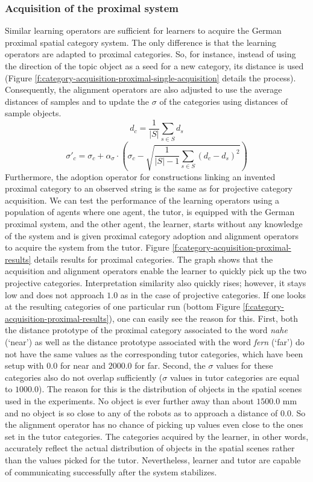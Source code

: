 \subsubsection{Acquisition of the proximal system}
Similar learning operators are sufficient for learners to acquire the 
German proximal spatial category system. The only difference is 
that the learning operators are adapted to proximal categories. So, for instance,
instead of using the direction of the topic object as a seed for a new category,
its distance is used (Figure \ref{f:category-acquisition-proximal-single-acquisition} 
details the process). Consequently, the alignment operators are also 
adjusted to use the average distances of samples and to 
update the $\sigma$ of the categories using distances of sample objects. 
\begin{equation}
d_c = \frac{1}{|S|}\sum_{s\in S} d_s
\label{e:update-d}
\end{equation} 
\begin{equation}
\sigma'_c = \sigma_c + \alpha_\sigma \cdot \left(\sigma_c - \sqrt{\frac{1}{|S|-1}\sum_{s\in S}(d_c - d_s)^2}\right)
\label{e:update-sigma-d}
\end{equation} 
Furthermore, the adoption operator for constructions linking an invented proximal category to 
an observed string is the same as for projective category acquisition.
We can test the performance of the learning 
operators using a population of agents where one agent, the tutor, 
is equipped with the German proximal system, and the other agent, 
the learner, starts without any knowledge 
of the system and is given proximal category adoption and alignment
operators to acquire the system from the tutor. Figure \ref{f:category-acquisition-proximal-results}
details results for proximal categories. The graph shows that 
the acquisition and alignment operators enable the learner to quickly pick up the
two projective categories. Interpretation similarity also quickly rises; however,
it stays low and does not approach $1.0$ as in the case of projective categories. 
If one looks at the resulting categories of one particular run 
(bottom Figure \ref{f:category-acquisition-proximal-results}), 
one can easily see the reason for this. First, both the distance prototype of the proximal category 
associated to the word \textit{nahe} (`near') as well as the distance prototype associated with the word 
\textit{fern} (`far') do not have the same values as the corresponding tutor categories, which have been
setup with $0.0$ for near and $2000.0$ for far. Second, the $\sigma$ values for these categories also
do not overlap sufficiently ($\sigma$ values in tutor categories are equal to $1000.0$). 
The reason for this is the distribution of objects in the spatial scenes used in the experiments. 
No object is ever further away than about $1500.0$ mm and no object is so close to any of the robots as to approach
a distance of $0.0$. So the alignment operator has no chance of picking up values even close
to the ones set in the tutor categories. The categories acquired by the learner, in other words,
accurately reflect the actual distribution of objects in the spatial scenes rather than the 
values picked for the tutor. Nevertheless, learner and tutor are capable of 
communicating successfully after the system stabilizes.


